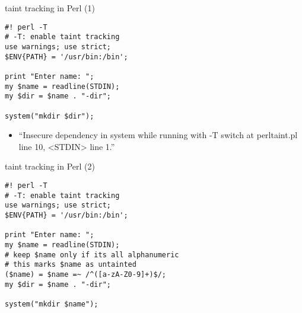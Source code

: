 \begin{frame}[fragile,label=perlTT1]{taint tracking in Perl (1)}
\begin{Verbatim}[fontsize=\small]
#! perl -T
# -T: enable taint tracking
use warnings; use strict;
$ENV{PATH} = '/usr/bin:/bin';

print "Enter name: ";
my $name = readline(STDIN);
my $dir = $name . "-dir";

system("mkdir $dir");
\end{Verbatim}
    \begin{itemize}
    \item ``Insecure dependency in system while running with -T switch at perltaint.pl line 10, <STDIN> line 1.''
    \end{itemize}
\end{frame}

\begin{frame}[fragile,label=perlTT2]{taint tracking in Perl (2)}
\begin{Verbatim}[fontsize=\small]
#! perl -T
# -T: enable taint tracking
use warnings; use strict;
$ENV{PATH} = '/usr/bin:/bin';

print "Enter name: ";
my $name = readline(STDIN);
# keep $name only if its all alphanumeric
# this marks $name as untainted
($name) = $name =~ /^([a-zA-Z0-9]+)$/;
my $dir = $name . "-dir";

system("mkdir $name");
\end{Verbatim}
\end{frame}


